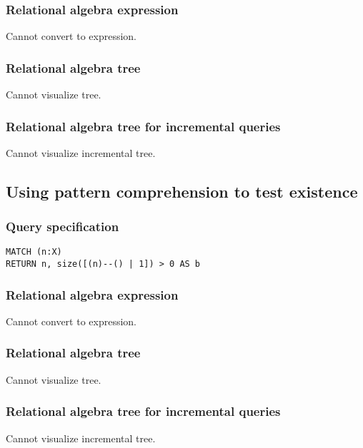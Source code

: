 \subsubsection*{Relational algebra expression}

Cannot convert to expression.

\subsubsection*{Relational algebra tree}

Cannot visualize tree.

\subsubsection*{Relational algebra tree for incremental queries}

Cannot visualize incremental tree.

\subsection{Using pattern comprehension to test existence}

\subsubsection*{Query specification}

\begin{lstlisting}
MATCH (n:X)
RETURN n, size([(n)--() | 1]) > 0 AS b
\end{lstlisting}

\subsubsection*{Relational algebra expression}

Cannot convert to expression.

\subsubsection*{Relational algebra tree}

Cannot visualize tree.

\subsubsection*{Relational algebra tree for incremental queries}

Cannot visualize incremental tree.

